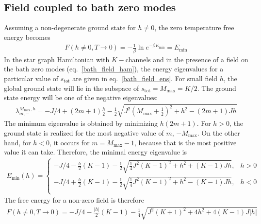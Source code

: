 \documentclass[12pt]{revtex4-2}
\begin{document}
\subsection{Field coupled to bath zero modes}
Assuming a non-degenerate ground state for \(h \neq 0\), the zero temperature free energy becomes
\begin{equation}\begin{aligned}
	F(h\neq 0, T\to 0) = -\frac{1}{\beta}\ln e^{-\beta E_\text{min}} = E_\text{min}
\end{aligned}\end{equation}
In the star graph Hamiltonian with \(K-\)channels and in the presence of a field on the bath zero modes (eq.~\ref{bath_field_ham}), the energy eigenvalues for a particular value of \(s_\text{tot}\) are given in eq.~\ref{bath_field_ens}. For small field \(h\), the global ground state will lie in the subspace of \(s_\text{tot} = M_\text{max} = K/2\). The ground state energy will be one of the negative eigenvalues:
\begin{equation}\begin{aligned}
	\lambda^{M_\text{max},h}_{m, -} = -J/4 + \left( 2m+1 \right)\frac{h}{2} - \frac{1}{2}\sqrt{J^2(M_\text{max}+\frac{1}{2})^2 + h^2 - \left( 2m+1 \right) Jh}
\end{aligned}\end{equation}
The minimum eigenvalue is obtained by minimizing \(h(2m+1)\). For \(h>0\), the ground state is realized for the most negative value of \(m\), \(-M_\text{max}\). On the other hand, for \(h<0\), it occurs for \(m=M_\text{max}-1\), because that is the most positive value it can take. Therefore, the minimal energy eigenvalue is
\begin{equation}\begin{aligned}
	E_\text{min}(h) = \begin{cases}
		-J/4 - \frac{h}{2}\left(K-1\right) - \frac{1}{2}\sqrt{\frac{1}{4}J^2(K+1)^2 + h^2 + \left(K-1\right) Jh}, & h>0\\
		-J/4 + \frac{h}{2}\left(K-1\right) - \frac{1}{2}\sqrt{\frac{1}{4}J^2(K+1)^2 + h^2 - \left(K-1\right) Jh}, & h<0\\
	\end{cases}
\end{aligned}\end{equation}
The free energy for a non-zero field is therefore
\begin{equation}\begin{aligned}
	F(h\neq 0, T\to 0) = -J/4 - \frac{|h|}{2}\left(K-1\right) - \frac{1}{4}\sqrt{J^2(K+1)^2 + 4h^2 + 4\left(K-1\right) J |h|}
\end{aligned}\end{equation}
\end{document}
